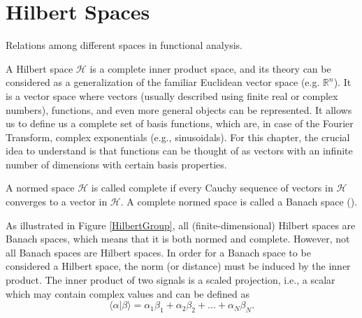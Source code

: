 \chapter{Hilbert Spaces}

\label{chap:hilbert}

\begin{marginfigure}
\vspace{7cm}
\centering

\vspace{0.1cm}
\caption{Relations among different spaces in functional analysis.}
\label{HilbertGroup} 
\end{marginfigure}

A Hilbert space $\mathcal{H}$ is a complete inner product space, and its theory can be considered as a generalization of the familiar Euclidean vector space (e.g. $\mathbb{R}^n$). It is a vector space where vectors (usually described using finite real or complex numbers), functions, and even more general objects can be represented. It allows us to define us a complete set of basis functions, which are, in case of the Fourier Transform, complex exponentials (e.g., sinusoidals). For this chapter, the crucial idea to understand is that functions can be thought of as vectors with an infinite number of dimensions with certain basis properties. 


\begin{theorem}
\label{banachSpace}
\vspace{0.1cm}
A normed
space $\mathcal{H}$ is called complete if every Cauchy sequence of vectors in $\mathcal{H}$ converges to a vector in $\mathcal{H}$. A complete normed space is called a Banach space (\cite{kennedy_hilbert_2013}).
\end{theorem}


As illustrated in Figure \ref{HilbertGroup}, all (finite-dimensional) Hilbert spaces are Banach spaces, which means that it is both normed and complete. However, not all Banach spaces are Hilbert spaces. In order for a Banach space to be considered a Hilbert space, the norm (or distance) must be induced by the inner product. The inner product of two signals is a scaled projection, i.e., a scalar which may contain complex values and can be defined as
\begin{equation}
    \langle \alpha|\beta \rangle = \alpha_1 \beta_1 + \alpha_2 \beta_2 + ... + \alpha_N \beta_N.
\end{equation}


